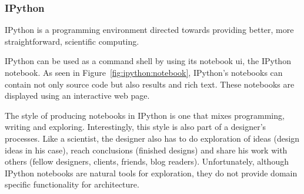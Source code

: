 

\subsubsection{IPython}
\label{section:ipython:related}
IPython\cite{PER-GRA:2007} is a programming environment directed towards providing better, more straightforward, scientific computing.

IPython can be used as a command shell by using its notebook \gls{ui}, the IPython notebook.
As seen in Figure~\ref{fig:ipython:notebook}, IPython's notebooks can contain not only source code but also results and rich text.
These notebooks are displayed using an interactive web page.

The style of producing notebooks in IPython is one that mixes programming, writing and exploring.
Interestingly, this style is also part of a designer's processes.
Like a scientist, the designer also has to do exploration of ideas (design ideas in his case), reach conclusions (finished designs) and share his work with others (fellow designers, clients, friends, blog readers).
Unfortunately, although IPython notebooks are natural tools for exploration, they do not provide domain specific functionality for architecture.


